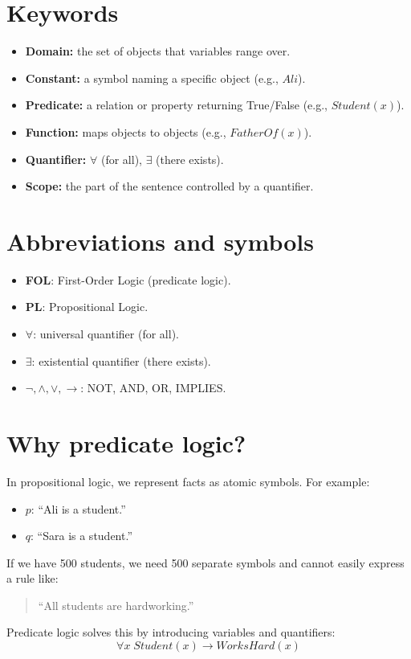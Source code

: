 \documentclass[11pt]{article}
\begin{document}
\section{Keywords}
\begin{itemize}[leftmargin=*]
  \item \textbf{Domain:} the set of objects that variables range over.
  \item \textbf{Constant:} a symbol naming a specific object (e.g., $Ali$).
  \item \textbf{Predicate:} a relation or property returning True/False (e.g., $Student(x)$).
  \item \textbf{Function:} maps objects to objects (e.g., $FatherOf(x)$).
  \item \textbf{Quantifier:} $\forall$ (for all), $\exists$ (there exists).
  \item \textbf{Scope:} the part of the sentence controlled by a quantifier.
\end{itemize}

\section{Abbreviations and symbols}
\begin{itemize}[leftmargin=*]
  \item \textbf{FOL}: First-Order Logic (predicate logic).
  \item \textbf{PL}: Propositional Logic.
  \item $\forall$: universal quantifier (for all).
  \item $\exists$: existential quantifier (there exists).
  \item $\lnot,\land,\lor,\rightarrow$: NOT, AND, OR, IMPLIES.
\end{itemize}

\section{Why predicate logic?}
In propositional logic, we represent facts as atomic symbols. For example:
\begin{itemize}[leftmargin=*]
  \item $p$: ``Ali is a student.''
  \item $q$: ``Sara is a student.''
\end{itemize}
If we have 500 students, we need 500 separate symbols and cannot easily express a rule like:
\begin{quote}
``All students are hardworking.''
\end{quote}
Predicate logic solves this by introducing variables and quantifiers:
\[
  \forall x\; Student(x) \rightarrow WorksHard(x)
\]
\end{document}
